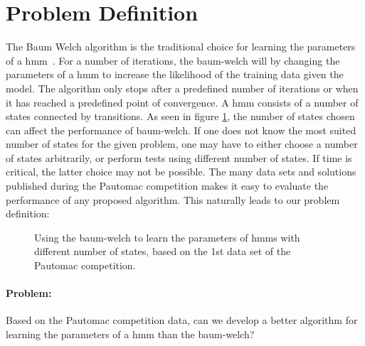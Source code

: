 \section{Problem Definition}

The Baum Welch algorithm is the traditional choice for learning the parameters of a \gls{hmm}~\cite{pautomacTR}. 
For a number of iterations, the \gls{baum-welch} will by changing the parameters of a \gls{hmm} to increase the likelihood of the training data given the model. The algorithm only stops after a predefined number of iterations or when it has reached a predefined point of convergence.
A \gls{hmm} consists of a number of states connected by transitions. As seen in figure \ref{fig:bw-states-are-important}, the number of states chosen can affect the performance of \gls{baum-welch}. If one does not know the most suited number of states for the given problem, one may have to either choose a number of states arbitrarily, or perform tests using different number of states. If time is critical, the latter choice may not be possible.
The many data sets and solutions published during the Pautomac competition makes it easy to evaluate the performance of any proposed algorithm.
This naturally leads to our problem definition:

\begin{figure}
\begin{centering}
\caption{Using the \gls{baum-welch} to learn the parameters of \gls{hmm}s with different number of states, based on the 1st data set of the Pautomac competition.}
\label{fig:bw-states-are-important} 
\end{centering}
\end{figure}


\paragraph{Problem:}

Based on the Pautomac competition data, can we develop a better algorithm for learning the parameters of a \gls{hmm} than the \gls{baum-welch}?
